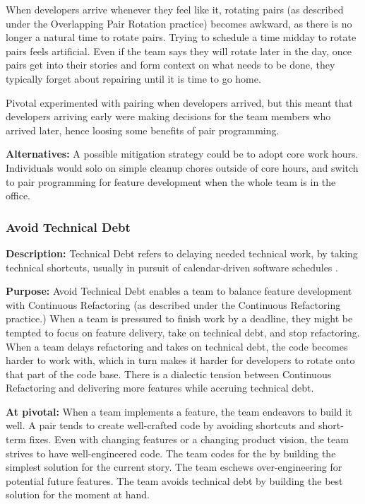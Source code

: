 When developers arrive whenever they feel like it, rotating pairs (as described under the Overlapping Pair Rotation practice) becomes awkward, as there is no longer a natural time to rotate pairs. Trying to schedule a time midday to rotate pairs feels artificial. Even if the team says they will rotate later in the day, once pairs get into their stories and form context on what needs to be done, they typically forget about repairing until it is time to go home.

Pivotal experimented with pairing when developers arrived, but this meant that developers arriving early were making decisions for the team members who arrived later, hence loosing some benefits of pair programming. 

\textbf{Alternatives:} A possible mitigation strategy could be to adopt core work hours. Individuals would solo on simple cleanup chores outside of core hours, and switch to pair programming for feature development when the whole team is in the office.  

\subsubsection{Avoid Technical Debt}
\textbf{Description:} Technical Debt refers to delaying needed technical work, by taking technical shortcuts, usually in pursuit of calendar-driven software schedules \cite{McConnellTechnicalDebt}.  

\textbf{Purpose:} Avoid Technical Debt enables a team to balance feature development with Continuous Refactoring (as described under the Continuous Refactoring practice.) When a team is pressured to finish work by a deadline, they might be tempted to focus on feature delivery, take on technical debt, and stop refactoring. When a team delays refactoring and takes on technical debt, the code becomes harder to work with, which in turn makes it harder for developers to rotate onto that part of the code base. There is a dialectic tension \cite{RalphProcessTheories} between Continuous Refactoring and delivering more features while accruing technical debt.

\textbf{At pivotal:} When a team implements a feature, the team endeavors to build it well. A pair tends to create well-crafted code by avoiding shortcuts and short-term fixes. Even with changing features or a changing product vision, the team strives to have well-engineered code. The team codes for the  by building the simplest solution for the current story. The team eschews over-engineering for potential future features. The team avoids technical debt by building the best solution for the moment at hand.  

